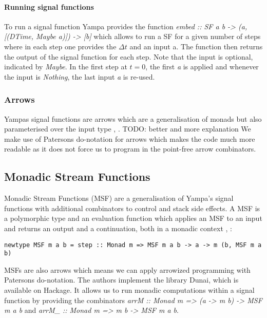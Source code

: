 \paragraph{Running signal functions}
To run a signal function Yampa provides the function \textit{embed :: SF a b -> (a, [(DTime, Maybe a)]) -> [b]} which allows to run a SF for a given number of steps where in each step one provides the $\Delta t$ and an input a. The function then returns the output of the signal function for each step. Note that the input is optional, indicated by \textit{Maybe}. In the first step at $t = 0$, the first \textit{a} is applied and whenever the input is \textit{Nothing}, the last input \textit{a} is re-used.

\subsubsection{Arrows}
Yampas signal functions are arrows which are a generalisation of monads but also parameterised over the input type \cite{hughes_generalising_2000}, \cite{hughes_programming_2005}. TODO: better and more explanation
We make use of Patersons do-notation for arrows \cite{paterson_new_2001} which makes the code much more readable as it does not force us to program in the point-free arrow combinators.

\subsection{Monadic Stream Functions}
Monadic Stream Functions (MSF) are a generalisation of Yampa's signal functions with additional combinators to control and stack side effects. A MSF is a polymorphic type and an evaluation function which applies an MSF to an input and returns an output and a continuation, both in a monadic context \cite{perez_functional_2016}, \cite{perez_extensible_2017}:
\begin{verbatim}
newtype MSF m a b = step :: Monad m => MSF m a b -> a -> m (b, MSF m a b)
\end{verbatim}

MSFs are also arrows which means we can apply arrowized programming with Patersons do-notation. The authors \cite{perez_functional_2016} implement the library Dunai, which is available on Hackage. It allows us to run monadic computations within a signal function by providing the combinators \textit{arrM :: Monad m => (a -> m b) -> MSF m a b} and \textit{arrM\_ :: Monad m => m b -> MSF m a b}.